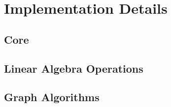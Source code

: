 \section{Implementation Details}

\subsection{Core}

\subsection{Linear Algebra Operations}

\subsection{Graph Algorithms}